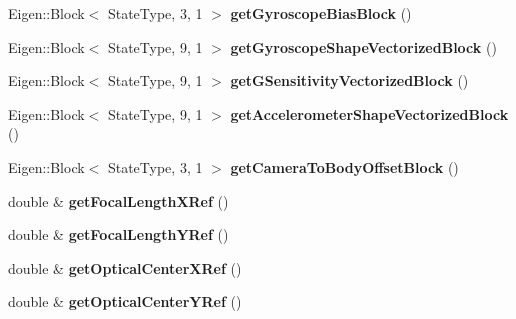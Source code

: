 \begin{DoxyCompactItemize}
\item 
\hypertarget{class_filter_state_a8bb562801b8b34026dad74bd4223c06e}{Eigen\-::\-Block$<$ State\-Type, 3, 1 $>$ {\bfseries get\-Gyroscope\-Bias\-Block} ()}\label{class_filter_state_a8bb562801b8b34026dad74bd4223c06e}

\item 
\hypertarget{class_filter_state_a8686bb8e54e2e9902c28095f8c623745}{Eigen\-::\-Block$<$ State\-Type, 9, 1 $>$ {\bfseries get\-Gyroscope\-Shape\-Vectorized\-Block} ()}\label{class_filter_state_a8686bb8e54e2e9902c28095f8c623745}

\item 
\hypertarget{class_filter_state_a1ab46a729807178faf9b6bebb87aa791}{Eigen\-::\-Block$<$ State\-Type, 9, 1 $>$ {\bfseries get\-G\-Sensitivity\-Vectorized\-Block} ()}\label{class_filter_state_a1ab46a729807178faf9b6bebb87aa791}

\item 
\hypertarget{class_filter_state_a57cb64b2b25132c2da38b0313da415c5}{Eigen\-::\-Block$<$ State\-Type, 9, 1 $>$ {\bfseries get\-Accelerometer\-Shape\-Vectorized\-Block} ()}\label{class_filter_state_a57cb64b2b25132c2da38b0313da415c5}

\item 
\hypertarget{class_filter_state_a844855f0fa5ebf0c606a06ea6fdb460b}{Eigen\-::\-Block$<$ State\-Type, 3, 1 $>$ {\bfseries get\-Camera\-To\-Body\-Offset\-Block} ()}\label{class_filter_state_a844855f0fa5ebf0c606a06ea6fdb460b}

\item 
\hypertarget{class_filter_state_a3b65a9649366c853ffd99784fe9bef72}{double \& {\bfseries get\-Focal\-Length\-X\-Ref} ()}\label{class_filter_state_a3b65a9649366c853ffd99784fe9bef72}

\item 
\hypertarget{class_filter_state_aed71d6cec7d8a101ba10b83f969d28d4}{double \& {\bfseries get\-Focal\-Length\-Y\-Ref} ()}\label{class_filter_state_aed71d6cec7d8a101ba10b83f969d28d4}

\item 
\hypertarget{class_filter_state_a3fc41a17c48851340acbfdfc9c164f01}{double \& {\bfseries get\-Optical\-Center\-X\-Ref} ()}\label{class_filter_state_a3fc41a17c48851340acbfdfc9c164f01}

\item 
\hypertarget{class_filter_state_a7ddf9eca9ab6cad9bee85ee6cfc80de0}{double \& {\bfseries get\-Optical\-Center\-Y\-Ref} ()}\label{class_filter_state_a7ddf9eca9ab6cad9bee85ee6cfc80de0}


\end{DoxyCompactItemize}
